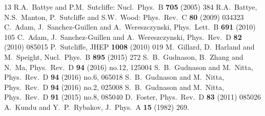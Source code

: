 \documentclass[12pt,a4paper]{article}
\begin{document}
\begin{small}
\begin{thebibliography}{13}
R.A.~Battye and P.M.~Sutcliffe: Nucl.\ Phys.\ B {\bf 705} (2005) 384
R.A.~Battye, N.S.~Manton, P.~Sutcliffe and S.W.~Wood: Phys.\ Rev.\ C {\bf 80} (2009) 034323
  C.~Adam, J.~Sanchez-Guillen and A.~Wereszczynski,
  Phys.\ Lett.\ B {\bf 691} (2010) 105
  C.~Adam, J.~Sanchez-Guillen and A.~Wereszczynski,
  Phys.\ Rev.\ D {\bf 82} (2010) 085015
  P.~Sutcliffe,
  JHEP {\bf 1008} (2010) 019
  M.~Gillard, D.~Harland and M.~Speight,
  Nucl.\ Phys.\ B {\bf 895} (2015) 272
  S.~B.~Gudnason, B.~Zhang and N.~Ma,
  Phys.\ Rev.\ D {\bf 94} (2016) no.12,  125004
  S.~B.~Gudnason and M.~Nitta,
  Phys.\ Rev.\ D {\bf 94} (2016) no.6,  065018
  S.~B.~Gudnason and M.~Nitta,
  Phys.\ Rev.\ D {\bf 94} (2016) no.2,  025008
  S.~B.~Gudnason and M.~Nitta,
  Phys.\ Rev.\ D {\bf 91} (2015) no.8,  085040
  D.~Foster,
  Phys.\ Rev.\ D {\bf 83} (2011) 085026
  A.~Kundu and Y.~P.~Rybakov,
  J.\ Phys.\ A {\bf 15} (1982) 269.

\end{thebibliography}
\end{small}
\end{document}

